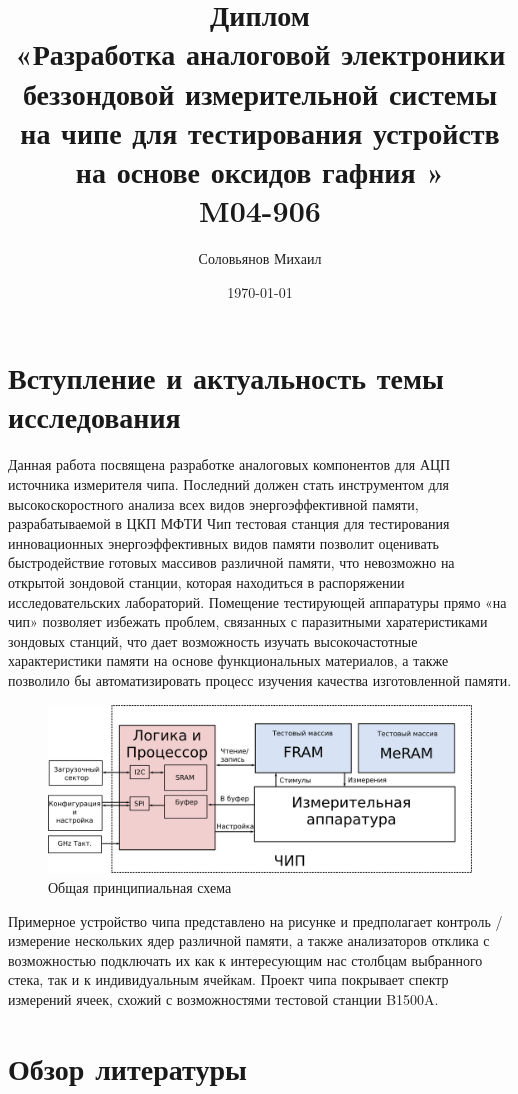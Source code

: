 \documentclass[a4paper,12pt]{article} %
\author{Соловьянов Михаил}
\title{Диплом \\ \LARGE{«Разработка аналоговой электроники беззондовой измерительной системы на чипе для тестирования устройств на основе оксидов гафния
»\\ M04-906}}
\date{\today}
\begin{document}

\tableofcontents
{}
\newpage



\section{Вступление и актуальность темы исследования}


Данная работа посвящена разработке аналоговых компонентов для АЦП источника измерителя чипа. Последний должен  стать инструментом для высокоскоростного  анализа всех видов энергоэффективной памяти, разрабатываемой в ЦКП МФТИ Чип тестовая станция для тестирования инновационных энергоэффективных видов памяти позволит оценивать быстродействие готовых массивов различной памяти, что невозможно на открытой зондовой станции, которая находиться в распоряжении исследовательских лабораторий. Помещение тестирующей аппаратуры прямо «на чип» позволяет избежать проблем, связанных с паразитными харатеристиками зондовых станций, что дает возможность изучать высокочастотные характеристики памяти на основе функциональных материалов, а также позволило бы автоматизировать процесс изучения качества изготовленной памяти.



\begin{figure}[H]
    \includegraphics[width=\textwidth]{top_ru.png}
    \caption{Общая принципиальная схема}
    \label{pic:top_ru}
\end{figure}

Примерное устройство чипа представлено на рисунке и предполагает контроль / измерение нескольких ядер различной памяти, а также анализаторов отклика с возможностью подключать их как к интересующим нас столбцам выбранного стека, так и к индивидуальным ячейкам. Проект чипа покрывает спектр измерений ячеек, схожий с возможностями тестовой станции B1500A.

\section{Обзор литературы}
\end{document}
